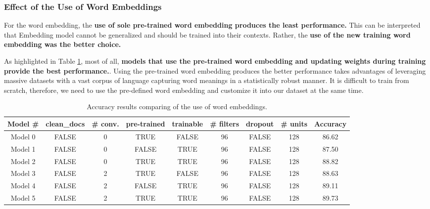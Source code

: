 \documentclass[11pt]{article}
\begin{document}
\subsubsection{Effect of the Use of Word Embeddings}

For the word embedding, the \textbf{use of sole pre-trained word embedding produces the least performance.} This can be interpreted that Embedding model cannot be generalized and should be trained into their contexts. Rather, the \textbf{use of the new training word embedding was the better choice.}

As highlighted in Table \ref{table:acc_wordembedding}, most of all, \textbf{models that use the pre-trained word embedding and updating weights during training provide the best performance.}.
Using the pre-trained word embedding produces the better performance takes advantages of leveraging massive datasets with a vast corpus of language capturing word meanings in a statistically robust manner. It is difficult to train from scratch, therefore, we need to use the pre-defined word embedding and customize it into our dataset at the same time.

\begin{table}[h!]
\centering
\begin{tabular}{||c|c|c|c|c|c|c|c|c||}
\hline
Model \# & clean\_docs &	\# conv.	& pre-trained &	trainable &	\# filters	& dropout &	\# units & Accuracy\\
\hline
Model 0   & FALSE	 & 0	&\cellcolor{yellow!25}TRUE	&\cellcolor{yellow!25}FALSE	&96	&FALSE	&128 & 86.62\\
\hline
Model 1	&	FALSE	&	0	&	\cellcolor{yellow!25}FALSE	&	\cellcolor{yellow!25}TRUE	&	96	&	FALSE	&	128	&	87.50\\
\hline
Model 2	&	FALSE	&	0	&	\cellcolor{blue!25}TRUE	&	\cellcolor{blue!25}TRUE	&	96	&	FALSE	&	128	&	\cellcolor{blue!25}88.82\\
\hline
\hline
Model 3	&	FALSE	&	2	&	\cellcolor{yellow!25}TRUE	&	\cellcolor{yellow!25}FALSE	&	96	&	FALSE	&	128	&	88.63\\
\hline
Model 4	&	FALSE	&	2	&	\cellcolor{yellow!25}FALSE	&	\cellcolor{yellow!25}TRUE	&	96	&	FALSE	&	128	&	89.11\\
\hline
Model 5	&	FALSE	&	2	&	\cellcolor{blue!25}TRUE	&	\cellcolor{blue!25}TRUE	&	96	&	FALSE	&	128	&	\cellcolor{blue!25}89.73\\
\hline
\end{tabular}
\caption{Accuracy results comparing of the use of word embeddings.}
\label{table:acc_wordembedding}
\end{table}
\end{document}
